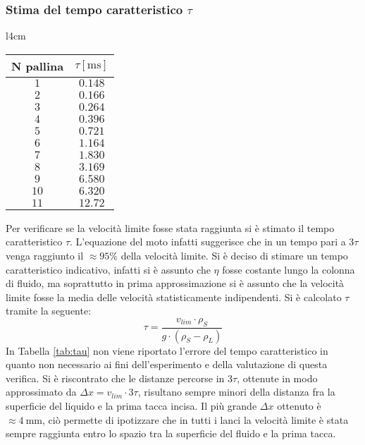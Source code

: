 \documentclass[a4paper,11pt,oneside]{article}
\begin{document}
\subsubsection*{Stima del tempo caratteristico $\tau$}
\begin{wraptable}{l}{4cm}
\centering
    \begin{tabular}{|c|c|}
        \hline
        \textbf{N pallina} & \textbf{$\tau [\si{\milli\second}]$} \\ \hline
        \rowcolor[rgb]{0.85,0.85,0.85}$1$ & $0.148$ \\ \hline
        $2$ & $0.166$ \\ \hline
        \rowcolor[rgb]{0.85,0.85,0.85}$3$ & $0.264$ \\ \hline
        $4$ & $0.396$ \\ \hline
        \rowcolor[rgb]{0.85,0.85,0.85}$5$ & $0.721$ \\ \hline
        $6$ & $1.164$ \\ \hline
        \rowcolor[rgb]{0.85,0.85,0.85}$7$ & $1.830$ \\ \hline
        $8$ & $3.169$ \\ \hline
        \rowcolor[rgb]{0.85,0.85,0.85}$9$ & $6.580$ \\ \hline
        $10$ & $6.320$ \\ \hline
        \rowcolor[rgb]{0.85,0.85,0.85}$11$ & $12.72$ \\ \hline
    \end{tabular}
    \caption{Tempo $\tau$}
    \label{tab:tau}
\end{wraptable}
Per verificare se la velocità limite fosse stata raggiunta si è stimato il tempo caratteristico $\tau$. L'equazione del moto infatti suggerisce che in un tempo pari a $3\tau$ venga raggiunto il $\approx 95\%$ della velocità limite.
Si è deciso di stimare un tempo caratteristico indicativo, infatti si è assunto che $\eta$ fosse costante lungo la colonna di fluido, ma soprattutto in prima approssimazione si è assunto che la velocità limite fosse la media delle velocità statisticamente indipendenti.
Si è calcolato $\tau$ tramite la seguente:
\begin{equation*}
    \tau = \frac{v_{lim} \cdot \rho_{S}}{g \cdot (\rho_{S} - \rho_{L})}
\end{equation*}
In Tabella \ref{tab:tau} non viene riportato l'errore del tempo caratteristico in quanto non necessario ai fini dell'esperimento e della valutazione di questa verifica. Si è riscontrato che le distanze percorse in $3\tau$, ottenute in modo approssimato da $\Delta x=v_{lim} \cdot 3 \tau$, risultano sempre minori della distanza fra la superficie del liquido e la prima tacca incisa. Il più grande $\Delta x$ ottenuto è $\approx \SI{4}{\milli\metre}$, ciò permette di ipotizzare che in tutti i lanci la velocità limite è stata sempre raggiunta entro lo spazio tra la superficie del fluido e la prima tacca.%
\end{document}
